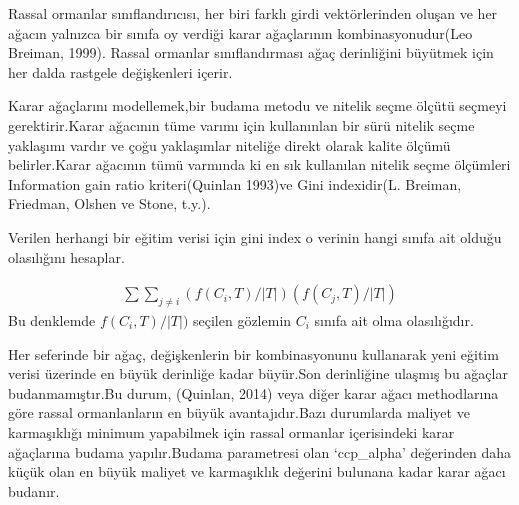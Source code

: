 \documentclass[12pt,twoside]{deuthesis}
\begin{document}
Rassal ormanlar sınıflandırıcısı, her biri farklı girdi vektörlerinden oluşan ve her ağacın yalnızca bir sınıfa oy verdiği karar ağaçlarının kombinasyonudur(Leo Breiman, 1999). Rassal ormanlar sınıflandırması ağaç derinliğini büyütmek için her dalda rastgele değişkenleri içerir.

Karar ağaçlarını modellemek,bir budama metodu ve nitelik seçme ölçütü seçmeyi gerektirir.Karar ağacının tüme varımı için kullanınlan bir sürü nitelik seçme yaklaşımı vardır ve çoğu yaklaşımlar niteliğe direkt olarak kalite ölçümü belirler.Karar ağacının tümü varmında ki en sık kullanılan nitelik seçme ölçümleri Information gain ratio kriteri(Quinlan 1993)ve Gini indexidir(L. Breiman, Friedman, Olshen ve Stone, t.y.).

Verilen herhangi bir eğitim verisi için gini index o verinin hangi sınıfa ait olduğu olasılığını hesaplar.

\[\begin{aligned}
\sum \sum_{j \neq i}(f(C_{i}, T) /|T|)(f(C_{j}, T) /|T|)
\end{aligned}\]
Bu denklemde \(f(C_{i}, T) /|T|)\) seçilen gözlemin \(C_{i}\) sınıfa ait olma olasılığıdır.

Her seferinde bir ağaç, değişkenlerin bir kombinasyonunu kullanarak yeni eğitim verisi üzerinde en büyük derinliğe kadar büyür.Son derinliğine ulaşmış bu ağaçlar budanmamıştır.Bu durum, (Quinlan, 2014) veya diğer karar ağacı methodlarına göre rassal ormanlanların en büyük avantajıdır.Bazı durumlarda maliyet ve karmaşıklığı minimum yapabilmek için rassal ormanlar içerisindeki karar ağaçlarına budama yapılır.Budama parametresi olan `ccp\_alpha' değerinden daha küçük olan en büyük maliyet ve karmaşıklık değerini bulunana kadar karar ağacı budanır.
\end{document}
